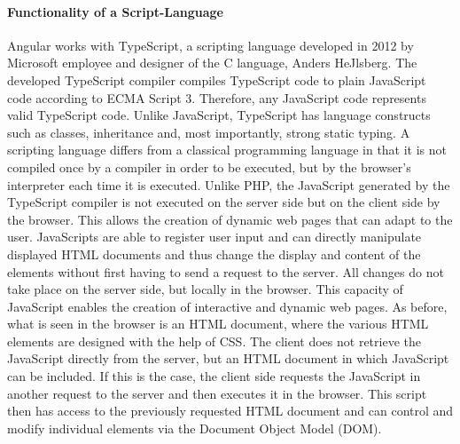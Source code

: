 \paragraph{Functionality of a Script-Language}
Angular works with TypeScript, a scripting language developed in 2012 by Microsoft employee and designer of the C language, Anders HeJlsberg. The developed TypeScript compiler compiles TypeScript code to plain JavaScript code according to ECMA Script 3. Therefore, any JavaScript code represents valid TypeScript code. Unlike JavaScript, TypeScript has language constructs such as classes, inheritance and, most importantly, strong static typing. A scripting language differs from a classical programming language in that it is not compiled once by a compiler in order to be executed, but by the browser's interpreter each time it is executed. Unlike PHP, the JavaScript generated by the TypeScript compiler is not executed on the server side but on the client side by the browser.  This allows the creation of dynamic web pages that can adapt to the user. JavaScripts are able to register user input and can directly manipulate displayed HTML documents and thus change the display and content of the elements without first having to send a request to the server.  All changes do not take place on the server side, but locally in the browser. This capacity of JavaScript enables the creation of interactive and dynamic web pages.  As before, what is seen in the browser is an HTML document, where the various HTML elements are designed with the help of CSS. The client does not retrieve the JavaScript directly from the server, but an HTML document in which JavaScript can be included. If this is the case, the client side requests the JavaScript in another request to the server and then executes it in the browser. This script then has access to the previously requested HTML document and can control and modify individual elements via the Document Object Model (DOM). 

